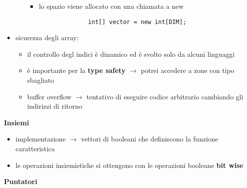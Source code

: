 \documentclass{article}
\begin{document}
\begin{flushleft}
\begin{itemize}
\begin{itemize}
\begin{itemize}
            \item lo spazio viene allocato con una chiamata a new
            \begin{lstlisting}
              int[] vector = new int[DIM]; 
            \end{lstlisting}
          \end{itemize}
        \end{itemize}
  \item sicurezza degli array:
  \begin{itemize}
    \item il controllo degl indici è dinamico ed è svolto solo da alcuni linguaggi
    \item è importante per la \textbf{type safety} $\rightarrow$ potrei accedere a zone con tipo sbagliato
    \item buffer overflow $\rightarrow$ tentativo di eseguire codice arbitrario cambiando gli indirizzi di ritorno
  \end{itemize}
\end{itemize}

\medskip

\textbf{Insiemi}

\begin{itemize}
  \item implementazione $\rightarrow$ vettori di booleani che definiscono la funzione caratteristica
  \item le operazioni insiemistiche si ottengono con le operazioni booleane \textbf{bit wise}
\end{itemize}

\medskip

\textbf{Puntatori}


\end{flushleft}
\end{document}
